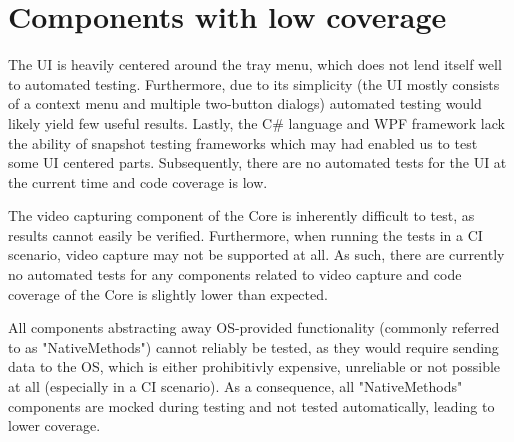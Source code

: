 \section{Components with low coverage}

The UI is heavily centered around the tray menu, which does not lend itself well to automated testing. Furthermore, due to its simplicity (the UI mostly consists of a context menu and multiple two-button dialogs) automated testing would likely yield few useful results. Lastly, the C\# language and WPF framework lack the ability of snapshot testing frameworks which may had enabled us to test some UI centered parts.
Subsequently, there are no automated tests for the UI at the current time and code coverage is low.

The video capturing component of the Core is inherently difficult to test, as results cannot easily be verified. Furthermore, when running the tests in a CI scenario, video capture may not be supported at all. As such, there are currently no automated tests for any components related to video capture and code coverage of the Core is slightly lower than expected.

All components abstracting away OS-provided functionality (commonly referred to as "NativeMethods") cannot reliably be tested, as they would require sending data to the OS, which is either prohibitivly expensive, unreliable or not possible at all (especially in a CI scenario). As a consequence, all "NativeMethods" components are mocked during testing and not tested automatically, leading to lower coverage.